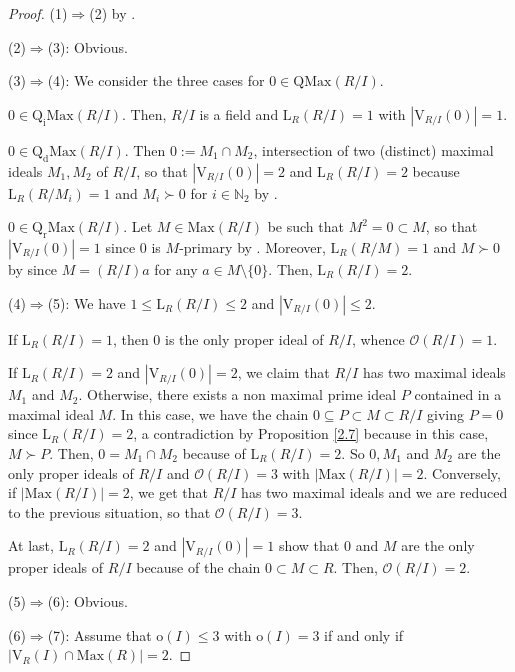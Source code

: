 \documentclass[12pt,leqno]{amsart}
\theoremstyle{definition}
\begin{document}
\begin{proof} (1)$\Rightarrow$(2) by \cite[Corollary 2]{AKKT}.

(2)$\Rightarrow$(3): Obvious.

(3)$\Rightarrow$(4): We consider the three cases for $0\in\mathrm {QMax} (R/I)$.

$0\in\mathrm{Q_iMax}( R/I)$. Then, $R/I$ is a field and $\mathrm{L}_R(R/I)=1$ with $|\mathrm{V}_{R/I}(0)|=1 $.

$0\in\mathrm{Q_dMax}( R/I)$. Then $0:=M_1\cap M_2$,  intersection of two (distinct) maximal ideals $M_1,M_2$ of $R/I$, so that $|\mathrm{V}_ {R/I}(0)|=2$ and $\mathrm{L}_R(R/I)=2$ because $\mathrm{L}_R(R/M_i)= 1$ and $M_i\succ 0$ for $i\in\mathbb N_2$ by \cite[Remark 2]{AKKT}. 

$0\in\mathrm{Q_rMax}( R/I)$. 
 Let $M\in\mathrm{Max}(R/I)$ be such that $M^2= 0\subset M$, so that $|\mathrm{V}_{R/I}(0)|=1$ since $0$ is $M$-primary by \cite[Proposition 3]{AKKT}. Moreover, $\mathrm{L}_R(R/M)=1$ and $M\succ 0$ by \cite[Corollary 2, p.237]{ZS} since $M=(R/I)a$ for any $a\in M\setminus\{0\}$. Then, $\mathrm{L}_R(R/I)=2$.

(4)$\Rightarrow$(5): We have $1\leq\mathrm{L}_R(R/I)\leq 2$ and $|\mathrm{V}_{R/I}(0)|\leq 2$. 

If $\mathrm{L}_R(R/I)=1$, then $0$ is the only proper ideal of $R/I$, whence $\mathcal O(R/I)=1$. 

If $\mathrm{L}_R(R/I)=2$ and $|\mathrm{V}_{R/I}(0)|=2$, we claim that $ R/I$ has two maximal ideals $M_1$ and $M_2$. Otherwise, there exists a non maximal prime ideal $P$ contained in a maximal ideal $M$. In this case, we have the chain $0\subseteq P\subset M\subset R/I$ giving $P=0 $ since $\mathrm{L}_R(R/I)=2$, a contradiction by Proposition \ref{2.7} because in this case, $M\succ P$. Then, $0=M_1\cap M_2$ because of $\mathrm{L}_R(R/I)=2$. So $0,M_1$ and $M_2$ are the only proper ideals of $R/I$ and $\mathcal O(R/I)=3$ with $|\mathrm{Max}(R/I)|=2$. Conversely, if $|\mathrm{Max}(R/I)|=2$, we get that $R/I$ has two maximal ideals and we are reduced to the previous situation, so that $\mathcal O(R/I)=3$. 

At last, $\mathrm{L}_R(R/I)=2$ and $|\mathrm{V}_{R/I}(0)|=1$ show that $0$ and $M$ are the only proper ideals of $R/I$ because of the chain $0\subset M\subset R$.  Then, $\mathcal O(R/I)=2$.

(5)$\Rightarrow$(6): Obvious.

(6)$\Rightarrow$(7): Assume that $\mathrm o(I)\leq 3$ with $\mathrm o(I) =3$ if and only if $|\mathrm{V}_R(I)\cap \mathrm{Max}(R)|= 2$.


\end{proof}
\end{document}
